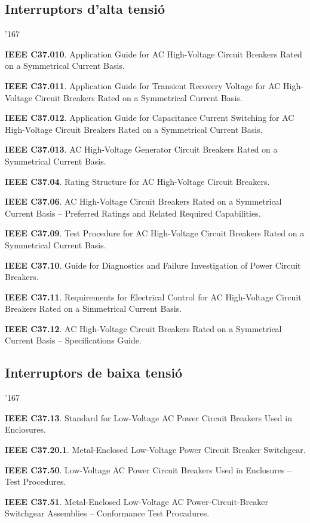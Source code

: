 \subsection*{Interruptors d'alta tensi\'{o}}
\begin{dinglist}{'167}
    \item \textbf{IEEE C37.010}. Application Guide for AC High-Voltage Circuit Breakers Rated on a Symmetrical Current Basis.
    \item \textbf{IEEE C37.011}. Application Guide for Transient Recovery Voltage for AC High-Voltage Circuit Breakers Rated on a Symmetrical Current Basis.
    \item \textbf{IEEE C37.012}. Application Guide for Capacitance Current Switching for AC High-Voltage Circuit Breakers Rated on a Symmetrical Current Basis.
    \item \textbf{IEEE C37.013}. AC High-Voltage Generator Circuit Breakers Rated on a Symmetrical Current Basis.
    \item \textbf{IEEE C37.04}. Rating Structure for AC High-Voltage Circuit Breakers.
    \item \textbf{IEEE C37.06}. AC High-Voltage Circuit Breakers Rated on a Symmetrical Current Basis -- Preferred Ratings and Related Required Capabilities.
    \item \textbf{IEEE C37.09}. Test Procedure for AC High-Voltage Circuit Breakers Rated on a Symmetrical Current Basis.
    \item \textbf{IEEE C37.10}. Guide for Diagnostics and Failure Investigation of Power Circuit Breakers.
    \item \textbf{IEEE C37.11}. Requirements for Electrical Control for AC High-Voltage Circuit Breakers Rated on a Simmetrical Current Basis.
    \item \textbf{IEEE C37.12}. AC High-Voltage Circuit Breakers Rated on a Symmetrical Current Basis -- Specifications Guide.
\end{dinglist}


\subsection*{Interruptors de baixa tensi\'{o}}
\begin{dinglist}{'167}
     \item \textbf{IEEE C37.13}. Standard for Low-Voltage AC Power Circuit Breakers Used in Enclosures. 
    \item \textbf{IEEE C37.20.1}. Metal-Enclosed Low-Voltage Power Circuit Breaker Switchgear.
    \item \textbf{IEEE C37.50}. Low-Voltage AC Power Circuit Breakers Used in Enclosures -- Test Procedures.
    \item \textbf{IEEE C37.51}. Metal-Enclosed Low-Voltage AC Power-Circuit-Breaker Switchgear Assemblies -- Conformance Test Procadures.
\end{dinglist}


